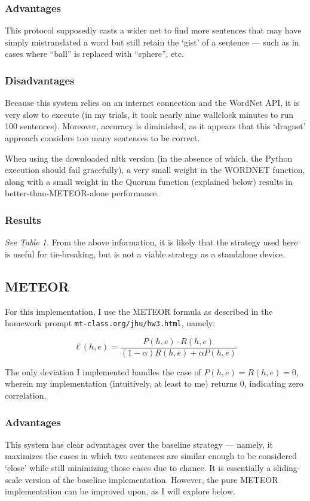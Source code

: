 \documentclass{article}
\begin{document}
\subsubsection{Advantages}
This protocol supposedly casts a wider net to find more sentences that may have simply mistranslated a word but still retain the `gist' of a sentence — such as in cases where ``ball'' is replaced with ``sphere'', etc.

\subsubsection{Disadvantages}
Because this system relies on an internet connection and the WordNet API, it is very slow to execute (in my trials, it took nearly nine wallclock minutes to run 100 sentences). Moreover, accuracy is diminished, as it appears that this `dragnet' approach considers too many sentences to be correct.

When using the downloaded nltk version (in the absence of which, the Python execution should fail gracefully), a very small weight in the WORDNET function, along with a small weight in the Quorum function (explained below) results in better-than-METEOR-alone performance.

\subsubsection{Results}
\textit{See Table 1.}  From the above information, it is likely that the strategy used here is useful for tie-breaking, but is not a viable strategy as a standalone device.

\subsection{METEOR}
For this implementation, I use the METEOR formula as described in the homework prompt \texttt{mt-class.org/jhu/hw3.html}, namely:

$$\displaystyle \ell(h,e) = \frac{P(h,e) \cdot R(h,e)}{(1-\alpha)R(h,e) + \alpha P(h,e)}$$

The only deviation I implemented handles the case of $P(h,e) = R(h,e) = 0$, wherein my implementation (intuitively, at least to me) returns $0$, indicating zero correlation.

\subsubsection{Advantages}
This system has clear advantages over the baseline strategy — namely, it maximizes the cases in which two sentences are similar enough to be considered `close' while still minimizing those cases due to chance. It is essentially a sliding-scale version of the baseline implementation. However, the pure METEOR implementation can be improved upon, as I will explore below.
\end{document}
